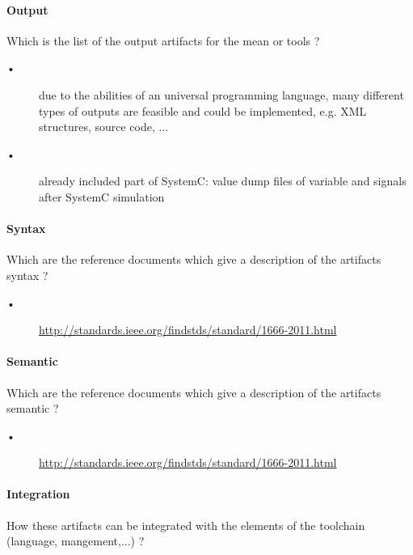 \paragraph{Output}
    Which is the list of the output artifacts for the mean or tools ?

\begin{author_comment}
\begin{description}
\item [•] due to the abilities of an universal programming language, many different types of outputs are feasible and could be implemented, e.g. XML structures, source code, ...
\item [•] already included part of SystemC: value dump files of variable and signals after SystemC simulation
\end{description}
\end{author_comment}
    
\paragraph{Syntax}
    Which are the reference documents which give a description of the artifacts syntax  ?
    
\begin{author_comment}
\begin{description}
\item [•] \url {http://standards.ieee.org/findstds/standard/1666-2011.html}
\end{description}
\end{author_comment}
    
\paragraph{Semantic}
    Which are the reference documents which give a description of the artifacts semantic  ?

\begin{author_comment}
\begin{description}
\item [•]  \url {http://standards.ieee.org/findstds/standard/1666-2011.html}
\end{description}
\end{author_comment}

\paragraph{Integration}
    How these artifacts can be integrated with the elements of the toolchain (language, mangement,...) ?


